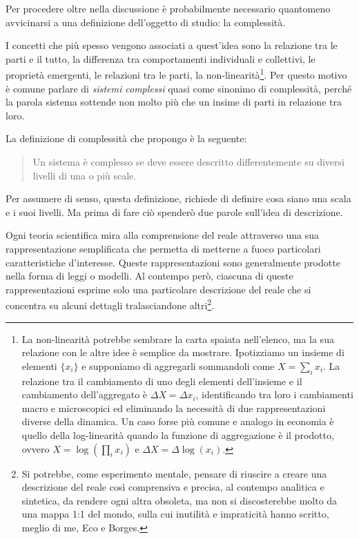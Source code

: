 \documentclass[a4paper, headings=standardclasses]{scrartcl}
\begin{document}
Per procedere oltre nella discussione è probabilmente necessario quantomeno avvicinarsi a una definizione dell'oggetto di studio: la complessità.

I concetti che più spesso vengono associati a quest'idea sono la relazione tra le parti e il tutto, la differenza tra comportamenti individuali e collettivi, le proprietà emergenti, le relazioni tra le parti, la non-linearità\footnote{La non-linearità potrebbe sembrare la carta spaiata nell'elenco, ma la sua relazione con le altre idee è semplice da mostrare. Ipotizziamo un insieme di elementi $\{x_i\}$ e supponiamo di aggregarli sommandoli come $X=\sum_i x_i$. La relazione tra il cambiamento di uno degli elementi dell'insieme e il cambiamento dell'aggregato è $\Delta X=\Delta x_i$, identificando tra loro i cambiamenti macro e microscopici ed eliminando la necessità di due rappresentazioni diverse della dinamica. Un caso forse più comune e analogo in economia è quello della log-linearità quando la funzione di aggregazione è il prodotto, ovvero $X = \log(\prod_i x_i)$ e $\Delta X=\Delta\log(x_i)$.}. Per questo motivo è comune parlare di \textit{sistemi complessi} quasi come sinonimo di complessità, perché la parola sistema sottende non molto più che un insime di parti in relazione tra loro.

La definizione di complessità che propongo è la seguente:
\begin{quote}
	Un sistema è complesso se deve essere descritto differentemente su diversi livelli di una o più scale.
\end{quote}

Per assumere di senso, questa definizione, richiede di definire cosa siano una scala e i suoi livelli. Ma prima di fare ciò spenderò due parole sull'idea di descrizione.

Ogni teoria scientifica mira alla comprensione del reale attraverso una sua rappresentazione semplificata che permetta di metterne a fuoco particolari caratteristiche d'interesse. Queste rappresentazioni sono generalmente prodotte nella forma di leggi o modelli.
Al contempo però, ciascuna di queste rappresentazioni esprime solo una particolare descrizione del reale che si concentra su alcuni dettagli tralasciandone altri\footnote{Si potrebbe, come esperimento mentale, pensare di riuscire a creare una descrizione del reale così comprensiva e precisa, al contempo analitica e sintetica, da rendere ogni altra obsoleta, ma non si discosterebbe molto da una mappa 1:1 del mondo, sulla cui inutilità e impraticità hanno scritto, meglio di me, Eco e Borges.}.
\end{document}
